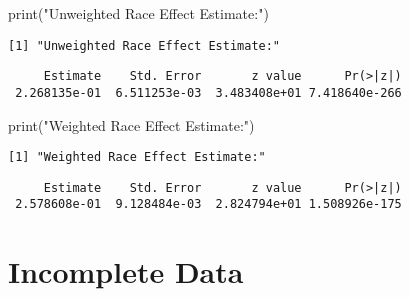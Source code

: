 \documentclass[
  letterpaper,
  DIV=11,
  numbers=noendperiod]{scrartcl}
\newenvironment{Shaded}{\begin{snugshade}}{\end{snugshade}}
\newcommand{\FunctionTok}[1]{\textcolor[rgb]{0.28,0.35,0.67}{#1}}
\newcommand{\NormalTok}[1]{\textcolor[rgb]{0.00,0.23,0.31}{#1}}
\newcommand{\SpecialCharTok}[1]{\textcolor[rgb]{0.37,0.37,0.37}{#1}}
\newcommand{\StringTok}[1]{\textcolor[rgb]{0.13,0.47,0.30}{#1}}
\begin{document}
\begin{Shaded}
\begin{Highlighting}[]
\FunctionTok{print}\NormalTok{(}\StringTok{"Unweighted Race Effect Estimate:"}\NormalTok{)}
\end{Highlighting}
\end{Shaded}

\begin{verbatim}
[1] "Unweighted Race Effect Estimate:"
\end{verbatim}

\begin{Shaded}
\end{Shaded}

\begin{verbatim}
     Estimate    Std. Error       z value      Pr(>|z|) 
 2.268135e-01  6.511253e-03  3.483408e+01 7.418640e-266 
\end{verbatim}

\begin{Shaded}
\begin{Highlighting}[]
\FunctionTok{print}\NormalTok{(}\StringTok{"Weighted Race Effect Estimate:"}\NormalTok{)}
\end{Highlighting}
\end{Shaded}

\begin{verbatim}
[1] "Weighted Race Effect Estimate:"
\end{verbatim}

\begin{Shaded}
\end{Shaded}

\begin{verbatim}
     Estimate    Std. Error       z value      Pr(>|z|) 
 2.578608e-01  9.128484e-03  2.824794e+01 1.508926e-175 
\end{verbatim}

\hypertarget{incomplete-data}{%
\section{Incomplete Data}\label{incomplete-data}}
\end{document}
